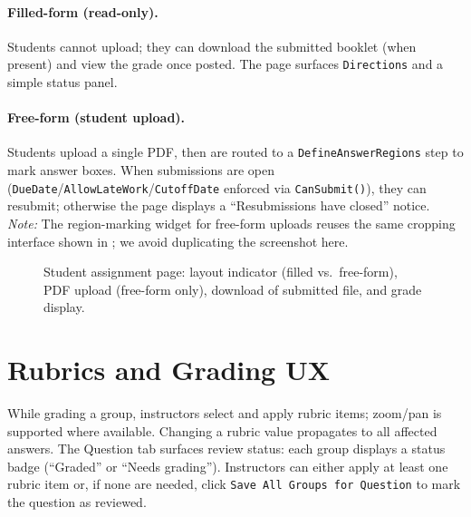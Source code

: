 \documentclass[ms,twoside,print]{nuthesis}
\begin{document}
\paragraph{Filled-form (read-only).}
Students cannot upload; they can download the submitted booklet (when present) and view the grade once posted. The page surfaces \texttt{Directions} and a simple status panel.

\paragraph{Free-form (student upload).}
Students upload a single PDF, then are routed to a \texttt{DefineAnswerRegions} step to mark answer boxes. When submissions are open (\texttt{DueDate}/\texttt{AllowLateWork}/\texttt{CutoffDate} enforced via \texttt{CanSubmit()}), they can resubmit; otherwise the page displays a \enquote{Resubmissions have closed} notice. \emph{Note:} The region-marking widget for free-form uploads reuses the same cropping interface shown in ; we avoid duplicating the screenshot here.

\begin{figure}[htb]
  \centering
  \caption{Student assignment page: layout indicator (filled vs.\ free-form), PDF upload (free-form only), download of submitted file, and grade display.}
  \label{fig:ui-student}
\end{figure}

\section{Rubrics and Grading UX}
While grading a group, instructors select and apply rubric items; zoom/pan is supported where available. Changing a rubric value propagates to all affected answers. The Question tab surfaces review status: each group displays a status badge (\enquote{Graded} or \enquote{Needs grading}). Instructors can either apply at least one rubric item or, if none are needed, click \texttt{Save All Groups for Question} to mark the question as reviewed.
\end{document}
